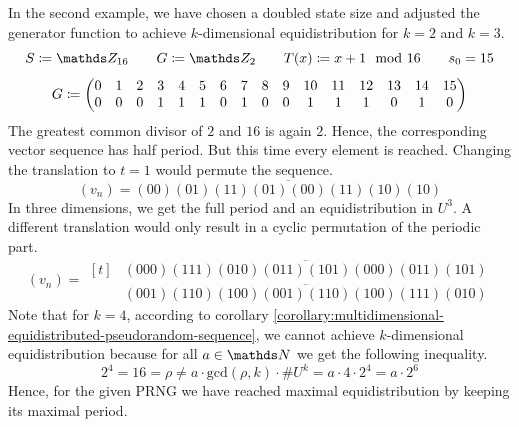 \documentclass{stdlocal}
\begin{document}
  \noindent
  In the second example, we have chosen a doubled state size and adjusted the generator function to achieve $k$-dimensional equidistribution for $k=2$ and $k=3$.
  \[
    S \define \setInteger_{16}
    \separate
    G \define \setInteger_2
    \separate
    T(x) \define x + 1 \mod 16
    \separate
    s_0 = 15
  \]
  \[
    \setcounter{MaxMatrixCols}{20}
    G \define
    \begin{pmatrix}
      0 & 1 & 2 & 3 & 4 & 5 & 6 & 7 & 8 & 9 & 10 & 11 & 12 & 13 & 14 & 15 \\
      0 & 0 & 0 & 1 & 1 & 1 & 0 & 1 & 0 & 0 & 1 & 1 & 1 & 0 & 1 & 0
    \end{pmatrix}
  \]
  The greatest common divisor of $2$ and $16$ is again $2$.
  Hence, the corresponding vector sequence has half period.
  But this time every element is reached.
  Changing the translation to $t=1$ would permute the sequence.
  \[
    (v_n) = \overline{(00)(01)(11)(01)(00)(11)(10)(10)}
  \]
  In three dimensions, we get the full period and an equidistribution in $U^3$.
  A different translation would only result in a cyclic permutation of the periodic part.
  \[
    (v_n) =
    \begin{aligned}[t]
      &\overline{(000)(111)(010)(011)(101)(000)(011)(101)} \\
      &\overline{(001)(110)(100)(001)(110)(100)(111)(010)}
    \end{aligned}
  \]
  Note that for $k=4$, according to corollary \ref{corollary:multidimensional-equidistributed-pseudorandom-sequence}, we cannot achieve $k$-dimensional equidistribution because for all $a\in\setNatural$ we get the following inequality.
  \[
    2^4 = 16 = ρ \neq a\cdot\mathrm{gcd}(ρ,k)\cdot\# U^k = a \cdot 4 \cdot 2^4 = a\cdot 2^6
  \]
  Hence, for the given PRNG we have reached maximal equidistribution by keeping its maximal period.

\end{document}
